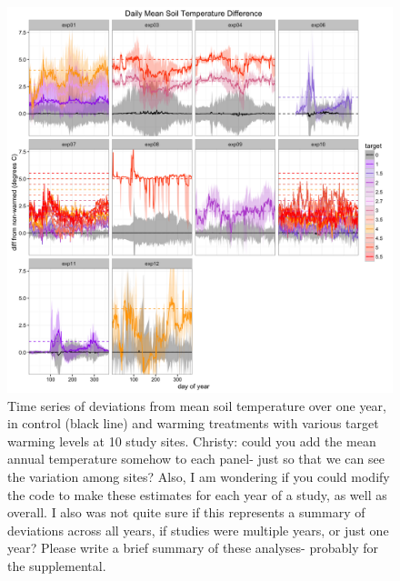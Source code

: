 \documentclass{article}
\begin{document}
\begin{figure}[h]
\centering
 \includegraphics{../Analyses/figures/Exploratory_TimeSeries_SoilTemp1Mean_Deviation.png}
 \caption{Time series of deviations from mean soil temperature over one year, in control (black line) and warming treatments with various target warming levels at 10 study sites. Christy: could you add the mean annual temperature somehow to each panel- just so that we can see the variation among sites? Also, I am wondering if you could modify the code to make these estimates for each year of a study, as well as overall. I also was not quite sure if this represents a summary of deviations across all years, if studies were multiple years, or just one year? Please write a brief summary of these analyses- probably for the supplemental.}
  \label{fig:effwarm}

 \end{figure}
\end{document}
